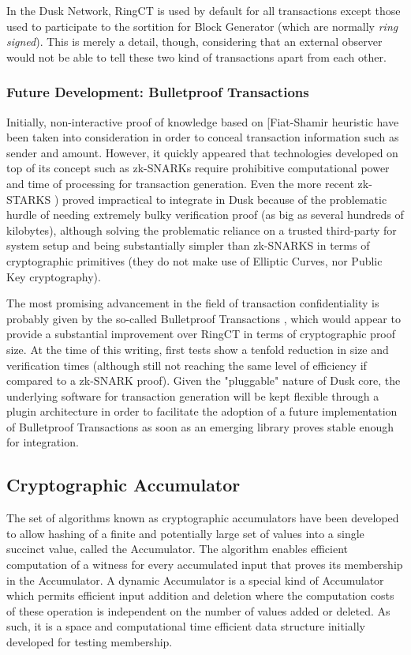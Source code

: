 In the \textrm{Dusk} Network, RingCT is used by default for all transactions except those used to participate to the sortition for Block Generator (which are normally \textit{ring signed}). This is merely a detail, though, considering that an external observer would not be able to tell these two kind of transactions apart from each other.

\subsubsection{Future Development: Bulletproof Transactions}

Initially, non-interactive proof of knowledge based on [Fiat-Shamir heuristic \cite{Shamir} have been taken into consideration in order to conceal transaction information such as sender and amount. However, it quickly appeared that technologies developed on top of its concept such as zk-SNARKs \cite{zcash} require prohibitive computational power and time of processing for transaction generation. Even the more recent zk-STARKS \cite{starks}) proved impractical to integrate in \textrm{Dusk} because of the problematic hurdle of needing extremely bulky verification proof (as big as several hundreds of kilobytes), although solving the problematic reliance on a trusted third-party for system setup and being substantially simpler than zk-SNARKS in terms of cryptographic primitives (they do not make use of Elliptic Curves, nor Public Key cryptography). 

The most promising advancement in the field of transaction confidentiality is probably given by the so-called Bulletproof Transactions \cite{bulletproofs}, which would appear to provide a substantial improvement over RingCT in terms of cryptographic proof size. At the time of this writing, first tests show a tenfold reduction in size and verification times (although still not reaching the same level of efficiency if compared to a zk-SNARK proof). Given the "pluggable" nature of \textrm{Dusk} core, the underlying software for transaction generation will be kept flexible through a plugin architecture in order to facilitate the adoption of a future implementation of Bulletproof Transactions as soon as an emerging library proves stable enough for integration.

\subsection{Cryptographic Accumulator}
\label{sec:Cryptographic-Accumulator}
The set of algorithms known as cryptographic accumulators have been developed to allow hashing of a finite and potentially large set of values into a single succinct value, called the Accumulator. The algorithm enables efficient computation of a witness for every accumulated input that proves its membership in the Accumulator. A dynamic Accumulator is a special kind of Accumulator which permits efficient input addition and deletion where the computation costs of these operation is independent on the number of values added or deleted. As such, it is a space and computational time efficient data structure initially developed for testing membership. 

